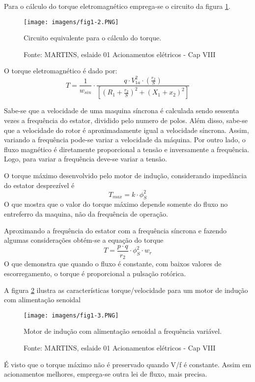 Para o cálculo do torque eletromagnético emprega-se o circuito da figura \ref{fig:fig1-1sss}.

\begin{figure}[ht!]
\center
\texttt{[image: imagens/fig1-2.PNG]}
\caption{\label{fig:fig1-1sss}Circuito equivalente para o cálculo do torque.}
\caption*{Fonte: MARTINS, eslaide 01 Acionamentos elétricos - Cap VIII}
\end{figure}

O torque eletromagnético é dado por:
\[T = \frac{1}{w_{sin}}\cdot \frac{q \cdot V_{1a}^2 \cdot \left ( \frac{r_{2}}{S} \right )}{\left [ \left ( R_{1} + \frac{r_{2}}{S}\right )^2 + \left ( X_{1}+x_{2} \right )^2\right ]}\]

Sabe-se que a velocidade de uma maquina síncrona é calculada sendo sessenta vezes a frequência do estator, dividido pelo numero de polos.
Além disso, sabe-se que a velocidade do rotor é aproximadamente igual a velocidade síncrona.
Assim, variando a frequência pode-se variar a velocidade da máquina. 
Por outro lado, o fluxo magnético é diretamente proporcional a tensão e inversamente a frequência. Logo, para variar a frequência deve-se variar a tensão.

O torque máximo desenvolvido pelo motor de indução, considerando impedância do estator desprezível é
\[T_{max} = k\cdot \phi_{S} ^2\]
O que mostra que o valor do torque máximo depende somente do fluxo no entreferro da maquina, não da frequência de operação.

Aproximando a frequência do estator com a frequência síncrona e fazendo algumas considerações obtém-se a equação do torque
\[T = \frac{p\cdot q}{r_{2}}\cdot \phi _S^2 \cdot w_{r}\]
O que demonstra que quando o fluxo é constante, com baixos valores de escorregamento, o torque é proporcional a pulsação rotórica.

A figura \ref{fig:fig1.3} ilustra as características torque/velocidade para um motor de indução com alimentação senoidal

\begin{figure}[ht!]
\center
\texttt{[image: imagens/fig1-3.PNG]}
\caption{\label{fig:fig1.3}Motor de indução com alimentação senoidal a frequência variável.}
\caption*{Fonte: MARTINS, eslaide 01 Acionamentos elétricos - Cap VIII}
\end{figure}

É visto que o torque máximo não é preservado quando V/f é constante. Assim em acionamentos melhores, emprega-se outra lei de fluxo, mais precisa.

